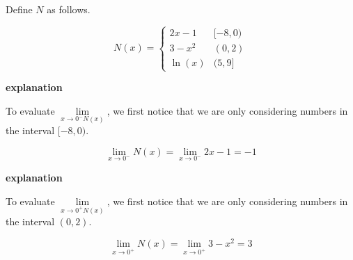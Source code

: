 \documentclass{ximera}
\begin{document}
\begin{example}

Define $N$ as follows.


\[
N(x) = 
\begin{cases}
  2x - 1   &    [-8, 0)     \\
  3 - x^2  &    (0, 2) \\
  \ln(x)    &    (5, 9]
\end{cases}
\]







\textbf{\textcolor{red!75!green}{explanation}} 


To evaluate $\lim\limits_{x \to 0^- N(x)}$, we first notice that we are only considering numbers in the interval $[-8, 0)$.


\[
\lim\limits_{x \to 0^-} N(x) = \lim\limits_{x \to 0^-} 2x - 1 = -1
\]













\textbf{\textcolor{red!75!green}{explanation}} 


To evaluate $\lim\limits_{x \to 0^+ N(x)}$, we first notice that we are only considering numbers in the interval $(0,2)$.


\[
\lim\limits_{x \to 0^+} N(x) = \lim\limits_{x \to 0^+} 3 - x^2 = 3
\]








\end{example}
\end{document}

